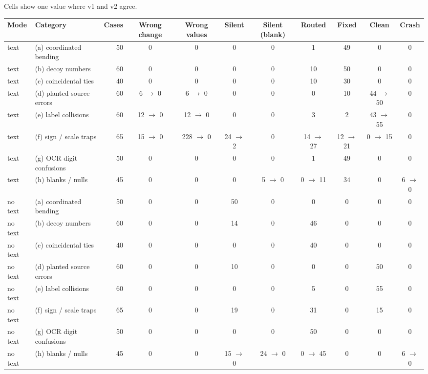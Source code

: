  Cells show one value where v1 and v2 agree.
\begin{center}\footnotesize\setlength{\tabcolsep}{3pt}
\begin{tabular}{llrcccccccc}
\toprule
Mode & Category & Cases & Wrong change & Wrong values & Silent & Silent (blank) & Routed & Fixed & Clean & Crash \\
\midrule
text & (a) coordinated bending & 50 & 0 & 0 & 0 & 0 & 1 & 49 & 0 & 0 \\
text & (b) decoy numbers & 60 & 0 & 0 & 0 & 0 & 10 & 50 & 0 & 0 \\
text & (c) coincidental ties & 40 & 0 & 0 & 0 & 0 & 10 & 30 & 0 & 0 \\
text & (d) planted source errors & 60 & 6 $\rightarrow$ 0 & 6 $\rightarrow$ 0 & 0 & 0 & 0 & 10 & 44 $\rightarrow$ 50 & 0 \\
text & (e) label collisions & 60 & 12 $\rightarrow$ 0 & 12 $\rightarrow$ 0 & 0 & 0 & 3 & 2 & 43 $\rightarrow$ 55 & 0 \\
text & (f) sign / scale traps & 65 & 15 $\rightarrow$ 0 & 228 $\rightarrow$ 0 & 24 $\rightarrow$ 2 & 0 & 14 $\rightarrow$ 27 & 12 $\rightarrow$ 21 & 0 $\rightarrow$ 15 & 0 \\
text & (g) OCR digit confusions & 50 & 0 & 0 & 0 & 0 & 1 & 49 & 0 & 0 \\
text & (h) blanks / nulls & 45 & 0 & 0 & 0 & 5 $\rightarrow$ 0 & 0 $\rightarrow$ 11 & 34 & 0 & 6 $\rightarrow$ 0 \\
\midrule
no text & (a) coordinated bending & 50 & 0 & 0 & 50 & 0 & 0 & 0 & 0 & 0 \\
no text & (b) decoy numbers & 60 & 0 & 0 & 14 & 0 & 46 & 0 & 0 & 0 \\
no text & (c) coincidental ties & 40 & 0 & 0 & 0 & 0 & 40 & 0 & 0 & 0 \\
no text & (d) planted source errors & 60 & 0 & 0 & 10 & 0 & 0 & 0 & 50 & 0 \\
no text & (e) label collisions & 60 & 0 & 0 & 0 & 0 & 5 & 0 & 55 & 0 \\
no text & (f) sign / scale traps & 65 & 0 & 0 & 19 & 0 & 31 & 0 & 15 & 0 \\
no text & (g) OCR digit confusions & 50 & 0 & 0 & 0 & 0 & 50 & 0 & 0 & 0 \\
no text & (h) blanks / nulls & 45 & 0 & 0 & 15 $\rightarrow$ 0 & 24 $\rightarrow$ 0 & 0 $\rightarrow$ 45 & 0 & 0 & 6 $\rightarrow$ 0 \\
\bottomrule
\end{tabular}
\end{center}

